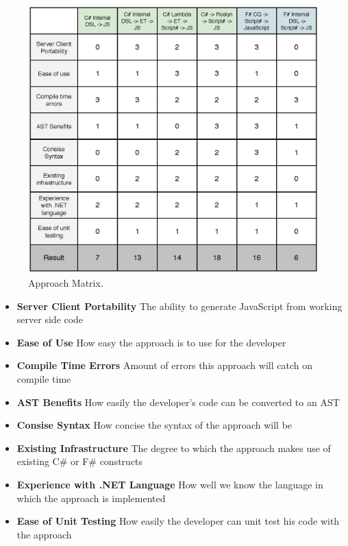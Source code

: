 	\begin{figure}
		\begin{center}
			\centerline{\includegraphics[width=16cm]{resources/images/approachmatrix.eps}}
		\end{center}
		\caption{Approach Matrix.}
		\label{approachMatrix}
	\end{figure}

	\begin{itemize}
		\item \textbf{Server Client Portability} The ability to generate JavaScript from working server side code
		\item \textbf{Ease of Use} How easy the approach is to use for the developer
		\item \textbf{Compile Time Errors} Amount of errors this approach will catch on compile time
		\item \textbf{AST Benefits} How easily the developer's code can be converted to an AST
		\item \textbf{Consise Syntax} How concise the syntax of the approach will be
		\item \textbf{Existing Infrastructure} The degree to which the approach makes use of existing C\# or F\# constructs
		\item \textbf{Experience with .NET Language} How well we know the language in which the approach is implemented
		\item \textbf{Ease of Unit Testing} How easily the developer can unit test his code with the approach
	\end{itemize}

